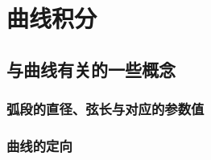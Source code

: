 

\chapter{曲线积分}\label{ch:21}

\section{与曲线有关的一些概念}
\subsection{弧段的直径、弦长与对应的参数值}
\subsection{曲线的定向}
